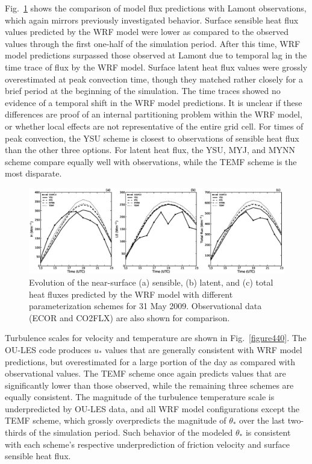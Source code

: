 Fig.~\ref{figure439} shows the comparison of model flux predictions with Lamont observations, which again mirrors previously investigated behavior. Surface sensible heat flux values predicted by the WRF model were lower as compared to the observed values through the first one-half of the simulation period. After this time, WRF model predictions surpassed those observed at Lamont due to temporal lag in the time trace of flux by the WRF model. Surface latent heat flux values were grossly overestimated at peak convection time, though they matched rather closely for a brief period at the beginning of the simulation. The time traces showed no evidence of a temporal shift in the WRF model predictions. It is unclear if these differences are proof of an internal partitioning problem within the WRF model, or whether local effects are not representative of the entire grid cell. For times of peak convection, the YSU scheme is closest to observations of sensible heat flux than the other three options. For latent heat flux, the YSU, MYJ, and MYNN scheme compare equally well with observations, while the TEMF scheme is the most disparate. 


\begin{figure}[ht!]
\begin{center}
\includegraphics[width=\textwidth]{figures/chapter4/shf_lhf_phys_20090531}
\end{center}
\caption{Evolution of the near-surface (a) sensible, (b) latent, and (c) total heat fluxes predicted by the WRF model with different parameterization schemes for 31 May 2009. Observational data (ECOR and CO2FLX) are also shown for comparison.}
\label{figure439}
\end{figure}


Turbulence scales for velocity and temperature are shown in Fig.~\ref{figure440}. The OU-LES code produces $u_*$ values that are generally consistent with WRF model predictions, but overestimated for a large portion of the day as compared with observational values. The TEMF scheme once again predicts values that are significantly lower than those observed, while the remaining three schemes are equally consistent. The magnitude of the turbulence temperature scale is underpredicted by OU-LES data, and all WRF model configurations except the TEMF scheme, which grossly overpredicts the magnitude of $\theta_*$ over the last two-thirds of the simulation period. Such behavior of the modeled $\theta_*$ is consistent with each scheme's respective underprediction of friction velocity and surface sensible heat flux.


